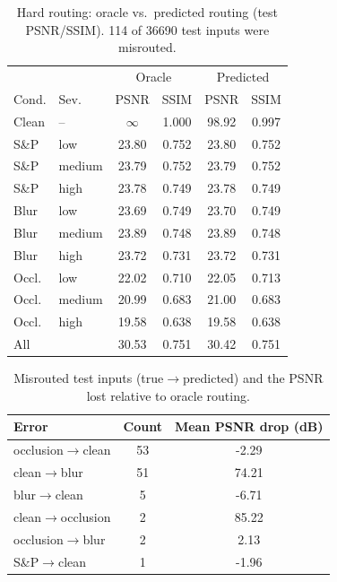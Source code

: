 \begin{table}[t]\centering\caption{Hard routing: oracle vs.\ predicted routing (test PSNR/SSIM). 114 of 36690 test inputs were misrouted.}\label{tab:routing}
\setlength{\tabcolsep}{3.5pt}\begin{tabular}{llcccc}\toprule
& & \multicolumn{2}{c}{Oracle} & \multicolumn{2}{c}{Predicted}\\ Cond. & Sev. & PSNR & SSIM & PSNR & SSIM\\\midrule
Clean & -- & $\infty$ & 1.000 & 98.92 & 0.997\\
S\&P & low & 23.80 & 0.752 & 23.80 & 0.752\\
S\&P & medium & 23.79 & 0.752 & 23.79 & 0.752\\
S\&P & high & 23.78 & 0.749 & 23.78 & 0.749\\
Blur & low & 23.69 & 0.749 & 23.70 & 0.749\\
Blur & medium & 23.89 & 0.748 & 23.89 & 0.748\\
Blur & high & 23.72 & 0.731 & 23.72 & 0.731\\
Occl. & low & 22.02 & 0.710 & 22.05 & 0.713\\
Occl. & medium & 20.99 & 0.683 & 21.00 & 0.683\\
Occl. & high & 19.58 & 0.638 & 19.58 & 0.638\\
\midrule All & & 30.53 & 0.751 & 30.42 & 0.751\\
\bottomrule\end{tabular}\end{table}
\begin{table}[t]\centering\caption{Misrouted test inputs (true$\to$predicted) and the PSNR lost relative to oracle routing.}\label{tab:misroute}
\begin{tabular}{lcc}\toprule Error & Count & Mean PSNR drop (dB)\\\midrule
occlusion$\rightarrow$clean & 53 & -2.29\\
clean$\rightarrow$blur & 51 & 74.21\\
blur$\rightarrow$clean & 5 & -6.71\\
clean$\rightarrow$occlusion & 2 & 85.22\\
occlusion$\rightarrow$blur & 2 & 2.13\\
S\&P$\rightarrow$clean & 1 & -1.96\\
\bottomrule\end{tabular}\end{table}